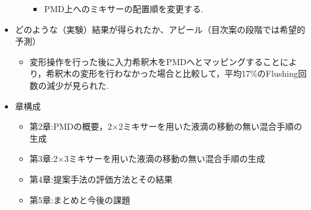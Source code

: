 \begin{itemize}
\begin{itemize}
{\begin{itemize}
                    \item PMD上へのミキサーの配置順を変更する.
            \end{itemize}}
    \end{itemize}
 \item どのような（実験）結果が得られたか、アピール（目次案の段階では希望的予測）
     \begin{itemize}
        \item 変形操作を行った後に入力希釈木をPMDへとマッピングすることにより，希釈木の変形を行わなかった場合と比較して，平均17\%のFlushing回数の減少が見られた.
     \end{itemize}

\item 章構成
    \begin{itemize}
    \item 第2章:PMDの概要，{2×2ミキサーを用いた液滴の移動の無い混合手順の生成}
    \item 第3章:{2×3ミキサーを用いた液滴の移動の無い混合手順の生成}
    \item 第4章:提案手法の評価方法とその結果
    \item 第5章:まとめと今後の課題
    \end{itemize}

\end{itemize}
